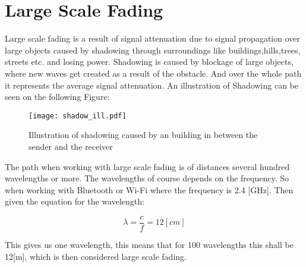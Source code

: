 \chapter{Large Scale Fading}
\label{larg_fad}

Large scale fading \citep{large_scale_fade} \citep{large_scale_fade2} is a result of signal attenuation due to signal propagation over large objects caused by shadowing through surroundings like buildings,hills,trees, streets etc. and losing power. Shadowing is caused by blockage of large objects, where new waves get created as a result of the obstacle. %
 And over the whole path it represents the average signal attenuation. An illustration of Shadowing can be seen on the following Figure:
 
\begin{figure}[H]
\centering
\texttt{[image: shadow\_ill.pdf]}
\caption{Illustration of shadowing caused by an building in between the sender and the receiver}
\label{large_scale_shadow}
\end{figure}

 The path when working with large scale fading is of distances several hundred wavelengths or more. The wavelengths of course depends on the frequency. So when working with Bluetooth or Wi-Fi where the frequency is 2.4 [GHz]. 
Then given the equation for the wavelength:

\begin{equation}
\lambda = \frac{c}{f} = 12 [cm] 
\end{equation}

This gives us one wavelength, this means that for 100 wavelengths this shall be 12[m], which is then considered large scale fading. %


